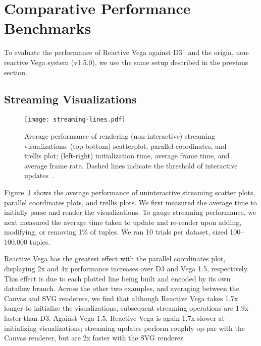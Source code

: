 
\vspace{-20pt}

\section{Comparative Performance Benchmarks}
\label{sec:vg:performance}

\vspace{-7pt}

To evaluate the performance of Reactive Vega against D3~\cite{bostock:d3} and
the origin, non-reactive Vega system (v1.5.0), we use the same setup described
in the previous section.

\vspace{-20pt}

\subsection{Streaming Visualizations}

\vspace{-7pt}

\begin{figure}[b!]
  \centering
  \texttt{[image: streaming-lines.pdf]}
  \caption{Average performance of rendering (non-interactive) streaming visualizations:
(top-bottom) scatterplot, parallel coordinates, and trellis plot; (left-right)
initialization time, average frame time, and average frame rate. Dashed lines
indicate the threshold of interactive updates~\cite{card:modelhuman}.}
  \label{fig:vg:static_benchmark}
\end{figure}

Figure~\ref{fig:vg:static_benchmark} shows the average performance of
uninteractive streaming scatter plots, parallel coordinates plots, and trellis
plots. We first measured the average time to initially parse and render the
visualizations. To gauge streaming performance, we next measured the average
time taken to update and re-render upon adding, modifying, or removing 1\% of
tuples. We ran 10 trials per dataset, sized 100--100,000 tuples.

Reactive Vega has the greatest effect with the parallel coordinates plot,
displaying 2x and 4x performance increases over D3 and Vega 1.5, respectively.
This effect is due to each plotted line being built and encoded by its own
dataflow branch. Across the other two examples, and averaging between the Canvas
and SVG renderers, we find that although Reactive Vega takes 1.7x longer to
initialize the visualizations, subsequent streaming operations are 1.9x faster
than D3. Against Vega 1.5, Reactive Vega is again 1.7x slower at initializing
visualizations; streaming updates perform roughly op-par with the Canvas
renderer, but are 2x faster with the SVG renderer.

